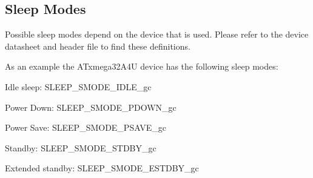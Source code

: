 \begin{DoxyEnumerate}
\begin{DoxyItemize}
\end{DoxyItemize}
\end{DoxyEnumerate}\hypertarget{xmega_sleep_quickstart_xmega_sleep_basic_sleep_modes}{}\subsection{Sleep Modes}\label{xmega_sleep_quickstart_xmega_sleep_basic_sleep_modes}
Possible sleep modes depend on the device that is used. Please refer to the device datasheet and header file to find these definitions.

As an example the A\-Txmega32\-A4\-U device has the following sleep modes\-:
\begin{DoxyItemize}
\item Idle sleep\-: S\-L\-E\-E\-P\-\_\-\-S\-M\-O\-D\-E\-\_\-\-I\-D\-L\-E\-\_\-gc
\item Power Down\-: S\-L\-E\-E\-P\-\_\-\-S\-M\-O\-D\-E\-\_\-\-P\-D\-O\-W\-N\-\_\-gc
\item Power Save\-: S\-L\-E\-E\-P\-\_\-\-S\-M\-O\-D\-E\-\_\-\-P\-S\-A\-V\-E\-\_\-gc
\item Standby\-: S\-L\-E\-E\-P\-\_\-\-S\-M\-O\-D\-E\-\_\-\-S\-T\-D\-B\-Y\-\_\-gc
\item Extended standby\-: S\-L\-E\-E\-P\-\_\-\-S\-M\-O\-D\-E\-\_\-\-E\-S\-T\-D\-B\-Y\-\_\-gc 
\end{DoxyItemize}